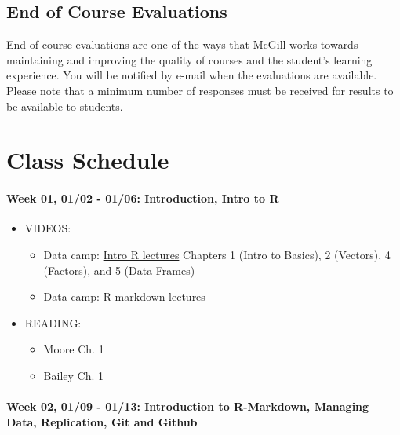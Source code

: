 \documentclass[11pt,]{article}
\providecommand{\tightlist}{%
  \setlength{\itemsep}{0pt}\setlength{\parskip}{0pt}}
\begin{document}
\subsection{End of Course Evaluations}\label{end-of-course-evaluations}

End-of-course evaluations are one of the ways that McGill works towards
maintaining and improving the quality of courses and the student's
learning experience. You will be notified by e-mail when the evaluations
are available. Please note that a minimum number of responses must be
received for results to be available to students. \newpage

\section{Class Schedule}\label{class-schedule}

\paragraph{Week 01, 01/02 - 01/06: Introduction, Intro to
R}\label{week-01-0102---0106-introduction-intro-to-r}

\begin{itemize}
\tightlist
\item
  VIDEOS:

  \begin{itemize}
  \tightlist
  \item
    Data camp:
    \href{https://www.datacamp.com/courses/free-introduction-to-r-beta}{Intro
    R lectures} Chapters 1 (Intro to Basics), 2 (Vectors), 4 (Factors),
    and 5 (Data Frames)
  \item
    Data camp:
    \href{https://www.datacamp.com/courses/reporting-with-r-markdown}{R-markdown
    lectures}
  \end{itemize}
\item
  READING:

  \begin{itemize}
  \tightlist
  \item
    Moore Ch. 1
  \item
    Bailey Ch. 1
  \end{itemize}
\end{itemize}

\paragraph{Week 02, 01/09 - 01/13: Introduction to R-Markdown, Managing
Data, Replication, Git and
Github}\label{week-02-0109---0113-introduction-to-r-markdown-managing-data-replication-git-and-github}
\end{document}
